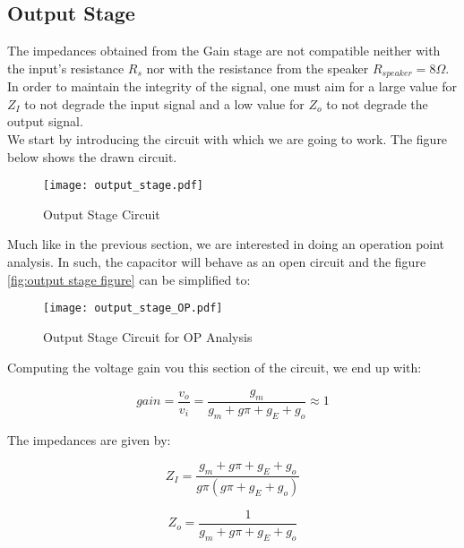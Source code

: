 \subsection{Output Stage}
The impedances obtained from the Gain stage are not compatible neither with the input's resistance $R_s$ nor with the resistance from the speaker $R_{speaker}=8\Omega$. In order to maintain the integrity of the signal, one must aim for a large value for $Z_I$ to not degrade the input signal and a low value for $Z_o$ to not degrade the output signal.\\

We start by introducing the circuit with which we are going to work. The figure below shows the drawn circuit.

\begin{figure}[h!]
\centering
\texttt{[image: output\_stage.pdf]}
\caption{Output Stage Circuit}
\label{fig:output_stage_figure}
\end{figure}

Much like in the previous section, we are interested in doing an operation point analysis. In such, the capacitor will behave as an open circuit and the figure \ref{fig:output stage figure} can be simplified to:

\begin{figure}[h!]
\centering
\texttt{[image: output\_stage\_OP.pdf]}
\caption{Output Stage Circuit for OP Analysis}
\label{fig:output_stage_figure_OP}
\end{figure}


Computing the voltage gain vou this section of the circuit, we end up with:

\begin{equation}
gain=\frac{v_o}{v_i}=\frac{g_m}{g_m+g{\pi}+g_E+g_o} \approx 1
\end{equation}

The impedances are given by:

\begin{equation}
Z_I=\frac{g_m+g{\pi}+g_E+g_o}{g{\pi}(g{\pi}+g_E+g_o)} 
\end{equation}


\begin{equation}
Z_o=\frac{1}{g_m+g{\pi}+g_E+g_o} 
\end{equation}